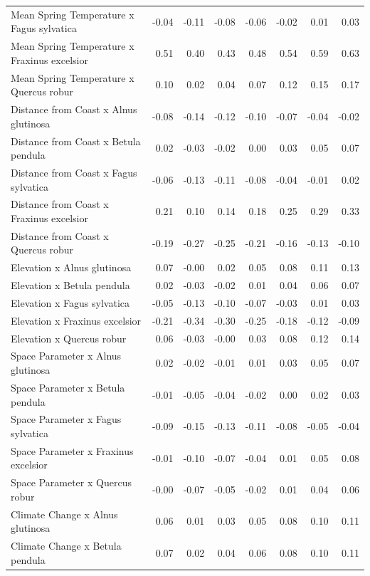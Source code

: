 \documentclass{article}\usepackage[]{graphicx}\usepackage[]{color}
\begin{document}
\begin{longtable}{lrrrrrrr}
  Mean Spring 
Temperature
x Fagus sylvatica & -0.04 & -0.11 & -0.08 & -0.06 & -0.02 & 0.01 & 0.03 \\ 
  Mean Spring 
Temperature
x Fraxinus excelsior & 0.51 & 0.40 & 0.43 & 0.48 & 0.54 & 0.59 & 0.63 \\ 
  Mean Spring 
Temperature
x Quercus robur & 0.10 & 0.02 & 0.04 & 0.07 & 0.12 & 0.15 & 0.17 \\ 
  Distance from 
Coast
x Alnus glutinosa & -0.08 & -0.14 & -0.12 & -0.10 & -0.07 & -0.04 & -0.02 \\ 
  Distance from 
Coast
x Betula pendula & 0.02 & -0.03 & -0.02 & 0.00 & 0.03 & 0.05 & 0.07 \\ 
  Distance from 
Coast
x Fagus sylvatica & -0.06 & -0.13 & -0.11 & -0.08 & -0.04 & -0.01 & 0.02 \\ 
  Distance from 
Coast
x Fraxinus excelsior & 0.21 & 0.10 & 0.14 & 0.18 & 0.25 & 0.29 & 0.33 \\ 
  Distance from 
Coast
x Quercus robur & -0.19 & -0.27 & -0.25 & -0.21 & -0.16 & -0.13 & -0.10 \\ 
  Elevation
x Alnus glutinosa & 0.07 & -0.00 & 0.02 & 0.05 & 0.08 & 0.11 & 0.13 \\ 
  Elevation
x Betula pendula & 0.02 & -0.03 & -0.02 & 0.01 & 0.04 & 0.06 & 0.07 \\ 
  Elevation
x Fagus sylvatica & -0.05 & -0.13 & -0.10 & -0.07 & -0.03 & 0.01 & 0.03 \\ 
  Elevation
x Fraxinus excelsior & -0.21 & -0.34 & -0.30 & -0.25 & -0.18 & -0.12 & -0.09 \\ 
  Elevation
x Quercus robur & 0.06 & -0.03 & -0.00 & 0.03 & 0.08 & 0.12 & 0.14 \\ 
  Space Parameter
x Alnus glutinosa & 0.02 & -0.02 & -0.01 & 0.01 & 0.03 & 0.05 & 0.07 \\ 
  Space Parameter
x Betula pendula & -0.01 & -0.05 & -0.04 & -0.02 & 0.00 & 0.02 & 0.03 \\ 
  Space Parameter
x Fagus sylvatica & -0.09 & -0.15 & -0.13 & -0.11 & -0.08 & -0.05 & -0.04 \\ 
  Space Parameter
x Fraxinus excelsior & -0.01 & -0.10 & -0.07 & -0.04 & 0.01 & 0.05 & 0.08 \\ 
  Space Parameter
x Quercus robur & -0.00 & -0.07 & -0.05 & -0.02 & 0.01 & 0.04 & 0.06 \\ 
  Climate Change
x Alnus glutinosa & 0.06 & 0.01 & 0.03 & 0.05 & 0.08 & 0.10 & 0.11 \\ 
  Climate Change
x Betula pendula & 0.07 & 0.02 & 0.04 & 0.06 & 0.08 & 0.10 & 0.11 \\ 

\end{longtable}
\end{document}
